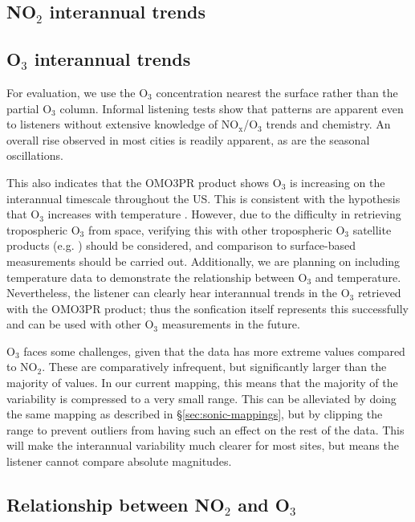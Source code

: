 \documentclass[a4paper,10pt,oneside]{article}
\newcommand{\ce}[1]{$\mathrm{#1}$}
\begin{document}
\begin{sloppy}
\subsection{NO$_2$ interannual trends}

\subsection{O$_3$ interannual trends}
For evaluation, we use the \ce{O_3} concentration nearest the surface rather than the partial \ce{O_3} column.  Informal listening tests show that patterns are apparent even to listeners without extensive knowledge of \ce{NO_x}/\ce{O_3} trends and chemistry.  An overall rise observed in most cities is readily apparent, as are the seasonal oscillations. 

This also indicates that the OMO3PR product shows \ce{O_3} is increasing on the interannual timescale throughout the US. This is consistent with the hypothesis that \ce{O_3} increases with temperature \cite{lin17}. However, due to the difficulty in retrieving tropospheric \ce{O_3} from space, verifying this with other tropospheric \ce{O_3} satellite products (e.g. \cite{choi08}) should be considered, and comparison to surface-based measurements should be carried out. Additionally, we are planning on including temperature data to demonstrate the relationship between \ce{O_3} and temperature.  Nevertheless, the listener can clearly hear interannual trends in the \ce{O_3} retrieved with the OMO3PR product; thus the sonfication itself represents this successfully and can be used with other \ce{O_3} measurements in the future.

\ce{O_3} faces some challenges, given that the data has more extreme values compared to \ce{NO_2}. These are comparatively infrequent, but significantly larger than the majority of values.  In our current mapping, this means that the majority of the variability is compressed to a very small range. This can be alleviated by doing the same mapping as described in \S\ref{sec:sonic-mappings}, but by clipping the range to prevent outliers from having such an effect on the rest of the data.  This will make the interannual variability much clearer for most sites, but means the listener cannot compare absolute magnitudes. 
 

\subsection{Relationship between NO$_2$ and O$_3$}


\end{sloppy}
\end{document}
